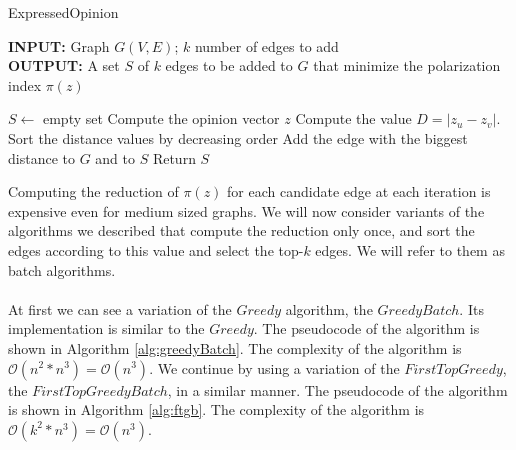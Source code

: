 \clearpage


\begin{algorithm}[H]
	\caption{ExpressedΟpinion}
	\label{alg:expressedOpinion}
	
	\begin{flushleft}
        		\textbf{INPUT:} Graph $G(V, E)$; $k$ number of edges to add\\
		\vspace{6pt}
        		\textbf{OUTPUT:} A set $S$ of $k$ edges to be added to $G$ that minimize the polarization
		\\ index $\pi(z)$
	\end{flushleft}
	
	\begin{algorithmic}[1]
		\STATE $S \leftarrow$ empty set 
			\STATE Compute the opinion vector $z$
				\STATE Compute the value $D=|z_u - z_v|$.
			\ENDFOR
			\STATE Sort the distance values by decreasing order
			\STATE Add the edge with the biggest distance to $G$ and to $S$
		\ENDFOR
		\STATE Return $S$
	\end{algorithmic}
	
\end{algorithm}
\vspace{20pt}
\noindent Computing the reduction of $\pi(z)$ for each candidate edge at each iteration is expensive even for medium sized graphs. We will now consider variants of the algorithms we described that compute the reduction only once, and sort the edges according to this value and select the top-$k$ edges. We will refer  to them as batch algorithms. 
\\
\\
At first we can see a variation of the $Greedy$ algorithm, the $GreedyBatch$. Its implementation is similar to the $Greedy$. The pseudocode of the algorithm is shown in Algorithm \ref{alg:greedyBatch}. The complexity of the algorithm is $\mathcal{O}(n^2*n^3) = \mathcal{O}(n^3)$. We continue by using a variation of the $FirstTopGreedy$, the $FirstTopGreedyBatch$, in a similar manner. The pseudocode of the algorithm is shown in Algorithm \ref{alg:ftgb}. The complexity of the algorithm is $\mathcal{O}(k^2*n^3) = \mathcal{O}(n^3)$.
\clearpage

